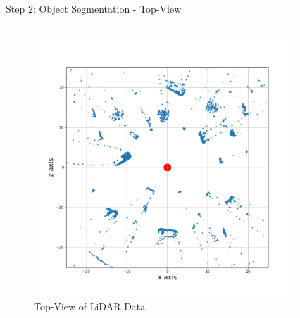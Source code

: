 \documentclass[9pt]{beamer}
\begin{document}

\begin{frame}[fragile]{Step 2: Object Segmentation - Top-View }


\begin{columns}
	\begin{column}{0.48\textwidth}
		\begin{figure}
			\centering
			\includegraphics[width=\textwidth]{./images/sector-transforms/scene-with-centre.pdf}
			 \caption{Top-View of LiDAR Data}
		\end{figure}
	\end{column}
	\begin{column}{0.48\textwidth}
		\begin{figure}
			\centering

\end{figure}
\end{column}
\end{columns}
\end{frame}
\end{document}
